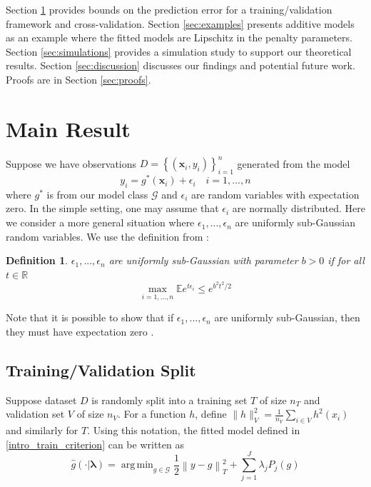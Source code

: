 \documentclass[12pt]{article}
\newtheorem{definition}{Definition}
\DeclareMathOperator*{\argmin}{arg\,min}
\begin{document}
Section \ref{sec:main_results} provides bounds on the prediction error for a training/validation framework and cross-validation.
Section \ref{sec:examples} presents additive models as an example where the fitted models are Lipschitz in the penalty parameters.
Section \ref{sec:simulations} provides a simulation study to support our theoretical results.
Section \ref{sec:discussion} discusses our findings and potential future work.
Proofs are in Section \ref{sec:proofs}.

\section{Main Result} \label{sec:main_results}

Suppose we have observations $D = \left \{ (\boldsymbol{x}_i, y_i) \right \}_{i=1}^n$ generated from the model
\begin{equation}
y_i = g^*(\boldsymbol x_i) + \epsilon_i \quad i=1,...,n
\end{equation}
where $g^*$ is from our model class $\mathcal{G}$ and $\epsilon_i$ are random variables with expectation zero. In the simple setting, one may assume that $\epsilon_i$ are normally distributed. Here we consider a more general situation where $\epsilon_1,...,\epsilon_n$ are uniformly sub-Gaussian random variables. We use the definition from \citep{Buldygin1980}:
\begin{definition}
	$\epsilon_1, ..., \epsilon_n$ are uniformly sub-Gaussian with parameter $b>0$ if for all $t \in \mathbb{R}$
	\begin{equation}
	\max_{i=1,...,n} \mathbb{E} e^{t \epsilon_i} \le e^{b^2t^2/2}
	\end{equation}
\end{definition}
Note that it is possible to show that if $\epsilon_1,...,\epsilon_n$ are uniformly sub-Gaussian, then they must have expectation zero \citep{stromberg1994probability}.

\subsection{Training/Validation Split}

Suppose dataset $D$ is randomly split into a training set $T$ of size $n_T$ and validation set $V$ of size $n_V$. For a function $h$, define $\| h \|_V^2 = \frac{1}{n_V}\sum_{i\in V} h^2(x_i)$ and similarly for $T$. Using this notation, the fitted model defined in  \eqref{intro_train_criterion} can be written as
\begin{equation}
\hat{g}(\cdot | \boldsymbol \lambda) = \argmin_{g\in \mathcal{G}} \frac{1}{2} \left \|y -  g \right \|_T^2 + \sum_{j=1}^J \lambda_j P_j(g)
\end{equation}
\end{document}
